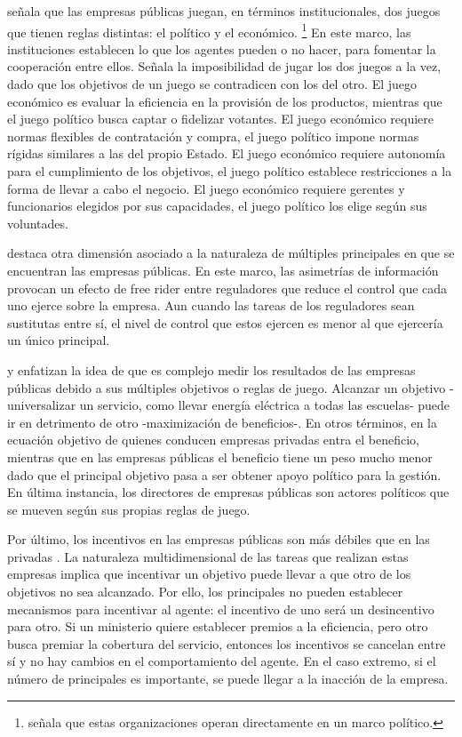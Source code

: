 \documentclass[
  12pt,
  spanish,
]{book}
\begin{document}
\citet{Miltnisky2001} señala que las empresas públicas juegan, en términos institucionales, dos juegos que tienen reglas distintas: el político y el económico.
\footnote{\citet{Dixit1997} señala que estas organizaciones operan directamente en un marco político.}
En este marco, las instituciones establecen lo que los agentes pueden o no hacer, para fomentar la cooperación entre ellos. Señala la imposibilidad de jugar los dos juegos a la vez, dado que los objetivos de un juego se contradicen con los del otro. El juego económico es evaluar la eficiencia en la provisión de los productos, mientras que el juego político busca captar o fidelizar votantes. El juego económico requiere normas flexibles de contratación y compra, el juego político impone normas rígidas similares a las del propio Estado. El juego económico requiere autonomía para el cumplimiento de los objetivos, el juego político establece restricciones a la forma de llevar a cabo el negocio. El juego económico requiere gerentes y funcionarios elegidos por sus capacidades, el juego político los elige según sus voluntades.

\citet{Martimort1996} destaca otra dimensión asociado a la naturaleza de múltiples principales en que se encuentran las empresas públicas. En este marco, las asimetrías de información provocan un efecto de free rider entre reguladores que reduce el control que cada uno ejerce sobre la empresa. Aun cuando las tareas de los reguladores sean sustitutas entre sí, el nivel de control que estos ejercen es menor al que ejercería un único principal.

\citet{Miltnisky2001} y \citet{Jones1982} enfatizan la idea de que es complejo medir los resultados de las empresas públicas debido a sus múltiples objetivos o reglas de juego. Alcanzar un objetivo -universalizar un servicio, como llevar energía eléctrica a todas las escuelas- puede ir en detrimento de otro -maximización de beneficios-. En otros términos, en la ecuación objetivo de quienes conducen empresas privadas entra el beneficio, mientras que en las empresas públicas el beneficio tiene un peso mucho menor dado que el principal objetivo pasa a ser obtener apoyo político para la gestión. En última instancia, los directores de empresas públicas son actores políticos que se mueven según sus propias reglas de juego.

Por último, los incentivos en las empresas públicas son más débiles que en las privadas \citep{Dixit1997}. La naturaleza multidimensional de las tareas que realizan estas empresas implica que incentivar un objetivo puede llevar a que otro de los objetivos no sea alcanzado. Por ello, los principales no pueden establecer mecanismos para incentivar al agente: el incentivo de uno será un desincentivo para otro. Si un ministerio quiere establecer premios a la eficiencia, pero otro busca premiar la cobertura del servicio, entonces los incentivos se cancelan entre sí y no hay cambios en el comportamiento del agente. En el caso extremo, si el número de principales es importante, se puede llegar a la inacción de la empresa.
\end{document}
